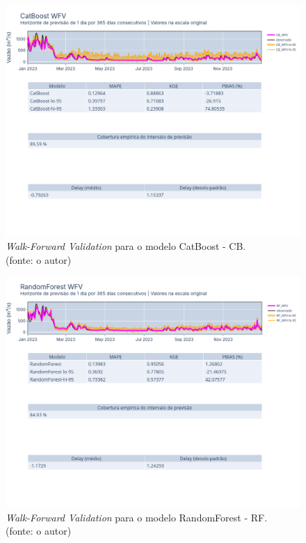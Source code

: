 \begin{figure}[!h]
\centering
\includegraphics[scale=0.33]{Figuras/jequiti/resultados/CB_WFV_ORIG.png}
\caption{\textit{Walk-Forward Validation} para o modelo CatBoost - CB.\\(fonte: o autor)}
\label{fig:jequiti_CB_WFV_ORIG}
\end{figure}

\begin{figure}[!h]
\centering
\includegraphics[scale=0.33]{Figuras/jequiti/resultados/RF_WFV_ORIG.png}
\caption{\textit{Walk-Forward Validation} para o modelo RandomForest - RF.\\(fonte: o autor)}
\label{fig:jequiti_RF_WFV_ORIG}
\end{figure}
\clearpage

